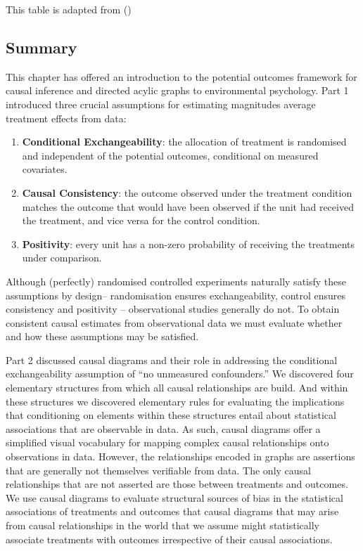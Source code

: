 \documentclass[
  singlecolumn]{article}
\begin{document}
\begin{table}

\caption{\label{tbl-lg}This table is adapted from
()}

\centering{

\examplelongitudinal

}

\end{table}%

\subsection{Summary}\label{summary}

This chapter has offered an introduction to the potential outcomes
framework for causal inference and directed acylic graphs to
environmental psychology. Part 1 introduced three crucial assumptions
for estimating magnitudes average treatment effects from data:

\begin{enumerate}
\def\labelenumi{\arabic{enumi}.}
\item
  \textbf{Conditional Exchangeability}: the allocation of treatment is
  randomised and independent of the potential outcomes, conditional on
  measured covariates.
\item
  \textbf{Causal Consistency}: the outcome observed under the treatment
  condition matches the outcome that would have been observed if the
  unit had received the treatment, and vice versa for the control
  condition.
\item
  \textbf{Positivity}: every unit has a non-zero probability of
  receiving the treatments under comparison.
\end{enumerate}

Although (perfectly) randomised controlled experiments naturally satisfy
these assumptions by design-- randomisation ensures exchangeability,
control ensures consistency and positivity -- observational studies
generally do not. To obtain consistent causal estimates from
observational data we must evaluate whether and how these assumptions
may be satisfied.

Part 2 discussed causal diagrams and their role in addressing the
conditional exchangeability assumption of ``no unmeasured confounders.''
We discovered four elementary structures from which all causal
relationships are build. And within these structures we discovered
elementary rules for evaluating the implications that conditioning on
elements within these structures entail about statistical associations
that are observable in data. As such, causal diagrams offer a simplified
visual vocabulary for mapping complex causal relationships onto
observations in data. However, the relationships encoded in graphs are
assertions that are generally not themselves verifiable from data. The
only causal relationships that are not asserted are those between
treatments and outcomes. We use causal diagrams to evaluate structural
sources of bias in the statistical associations of treatments and
outcomes that causal diagrams that may arise from causal relationships
in the world that we assume might statistically associate treatments
with outcomes irrespective of their causal associations.
\end{document}
